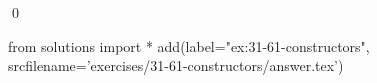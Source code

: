 
\begin{ex}
  \label{ex:31-61-constructors}
  
  \qed
\end{ex}
\begin{python0}
from solutions import *
add(label="ex:31-61-constructors",
    srcfilename='exercises/31-61-constructors/answer.tex')
\end{python0}
